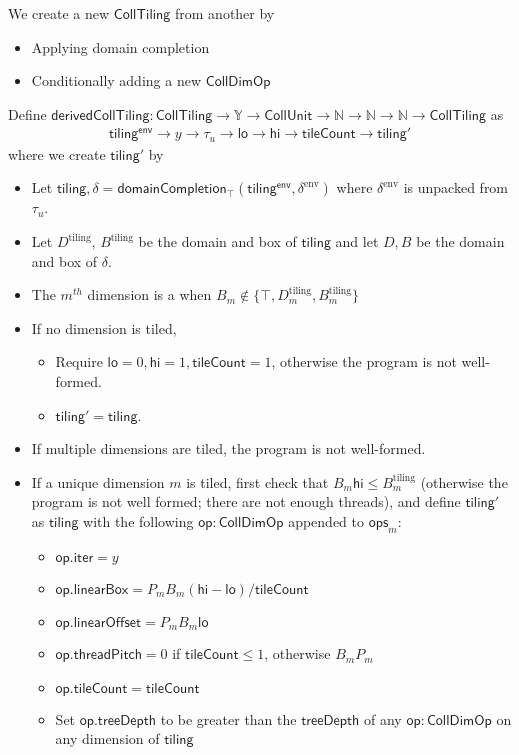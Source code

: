 We create a new $\mathsf{CollTiling}$ from another by
\begin{itemize}
  \item Applying domain completion
  \filbreak
  \item Conditionally adding a new $\mathsf{CollDimOp}$
\end{itemize}
\filbreak
Define $\mathsf{derivedCollTiling}: \mathsf{CollTiling} \to \mathbb{Y} \to \mathsf{CollUnit} \to \mathbb{N} \to \mathbb{N} \to \mathbb{N} \to \mathsf{CollTiling}$ as
\begin{gather*}
  \mathsf{tiling^{env}} \to y \to \tau_u \to \mathsf{lo} \to \mathsf{hi} \to \mathsf{tileCount} \to \mathsf{tiling'}
\end{gather*}
where we create $\mathsf{tiling'}$ by
\filbreak
\begin{itemize}
  \item Let $\mathsf{tiling}, \delta = \mathsf{domainCompletion_\top}(\mathsf{tiling^{env}}, \delta^\text{env})$ where $\delta^\text{env}$ is unpacked from $\tau_u$.
  \filbreak
  \item Let $D^\text{tiling}$, $B^\text{tiling}$ be the domain and box of $\mathsf{tiling}$ and let $D, B$ be the domain and box of $\delta$.
  \filbreak
  \item The $m^{th}$ dimension is a  when $B_m \notin \{ \top, D_m^\text{tiling}, B_m^\text{tiling} \}$
  \filbreak
  \item If no dimension is tiled,
  \begin{itemize}
    \item Require $\mathsf{lo}=0, \mathsf{hi}=1, \mathsf{tileCount} = 1$, otherwise the program is not well-formed.
    \item $\mathsf{tiling}' = \mathsf{tiling}$.
  \end{itemize}
  \filbreak
  \item If multiple dimensions are tiled, the program is not well-formed.
  \filbreak
  \item If a unique dimension $m$ is tiled, first check that $B_m \mathsf{hi} \le B_m^\text{tiling}$ (otherwise the program is not well formed; there are not enough threads), and define $\mathsf{tiling}'$ as $\mathsf{tiling}$ with the following $\mathsf{op}: \mathsf{CollDimOp}$ appended to $\mathsf{ops}_m$:
  \begin{itemize}
    \item $\mathsf{op.iter} = y$
    \filbreak
    \item $\mathsf{op.linearBox} = P_m B_m (\mathsf{hi} - \mathsf{lo}) / \mathsf{tileCount}$
    \filbreak
    \item $\mathsf{op.linearOffset} = P_m B_m \mathsf{lo}$
    \filbreak
    \item $\mathsf{op.threadPitch} = 0$ if $\mathsf{tileCount} \le 1$, otherwise $B_m P_m$
    \filbreak
    \item $\mathsf{op.tileCount} = \mathsf{tileCount}$
    \filbreak
    \item Set $\mathsf{op.treeDepth}$ to be greater than the $\mathsf{treeDepth}$ of any $\mathsf{op: CollDimOp}$ on any dimension of $\mathsf{tiling}$
  \end{itemize}
\end{itemize}
